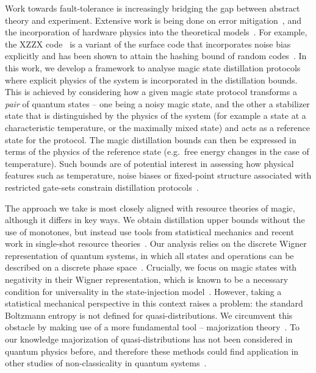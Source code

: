 \documentclass[
onecolumn,
superscriptaddress
]{revtex4-1}
\begin{document}
Work towards fault-tolerance is increasingly bridging the gap between abstract theory and experiment. Extensive work is being done on error mitigation~\cite{jones_2012, Li_2017, Temme_2017, Endo_2018, McClean_2017}, and the incorporation of hardware physics into the theoretical models~\cite{Kandala_2019, holmes_resource_2019, Colless_2018, song2018quantum, Bravyi_2021}. For example, the XZZX code~\cite{bonilla_ataides_xzzx_2021} is a variant of the surface code that incorporates noise bias explicitly and has been shown to attain the hashing bound of random codes~\cite{Bennett_1996}. In this work, we develop a framework to analyse magic state distillation protocols where explicit physics of the system is incorporated in the distillation bounds. This is achieved by considering how a given magic state protocol transforms a \emph{pair} of quantum states -- one being a noisy magic state, and the other a stabilizer state that is distinguished by the physics of the system (for example a state at a characteristic temperature, or the maximally mixed state) and acts as a reference state for the protocol. The magic distillation bounds can then be expressed in terms of the physics of the reference state (e.g.~free energy changes in the case of temperature). Such bounds are of potential interest in assessing how physical features such as temperature, noise biases or fixed-point structure associated with restricted gate-sets constrain distillation protocols~\cite{Tuckett_2019, Aliferis_2008, Stephens_2013, Li_2015, Babbush_2018, Guillaud_2019, Fowler_2019}.

The approach we take is most closely aligned with resource theories of magic, although it differs in key ways. We obtain distillation upper bounds without the use of monotones, but instead use tools from statistical mechanics and recent work in single-shot resource theories~\cite{cit:janzing, cit:horodecki2013, Brandao_2015, Vinjanampathy_2016, Goold_2016, cit:lostaglio, cit:gour}. Our analysis relies on the discrete Wigner representation of quantum systems, in which all states and operations can be described on a discrete phase space~\cite{Ferrie_2008, Okay_2021}. Crucially, we focus on magic states with negativity in their Wigner representation, which is known to be a necessary condition for universality in the state-injection model~\cite{cit:veitch, cit:mari, cit:gottesman, cit:knill, Campbell_2011}. However, taking a statistical mechanical perspective in this context raises a problem: the standard Boltzmann entropy is not defined for quasi-distributions. We circumvent this obstacle by making use of a more fundamental tool -- majorization theory~\cite{cit:marshall, Veinott_1971, Ruch_1976}. To our knowledge majorization of quasi-distributions has not been considered in quantum physics before, and therefore these methods could find application in other studies of non-classicality in quantum systems~\cite{Fine_1982, Allahverdyan_2018, arvidsson_2020, halpern_2018, Lostaglio_2018, Levy_2020}.
\end{document}
